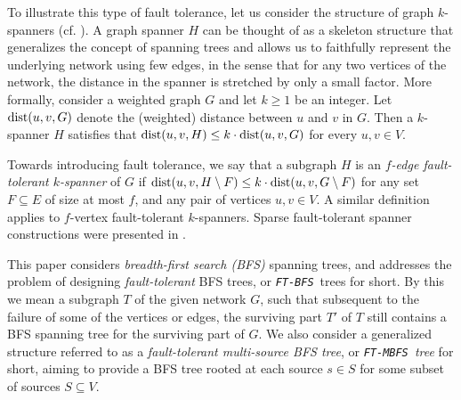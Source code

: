 \documentclass[12pt]{article}
\newcommand{\dist}{\mbox{\rm dist}}
\def\FTMBFS{\mbox{\tt FT-MBFS}}
\def\FTBFS{\mbox{\tt FT-BFS}}
\begin{document}
To illustrate this type of fault tolerance,
let us consider the structure of graph $k$-spanners
(cf. \cite{Peleg00:book,PelegS-89,PelegU-89}).
A graph spanner $H$ can be thought of as a skeleton structure
that generalizes the concept of spanning trees and allows us
to faithfully represent the underlying network using few edges,
in the sense that for any two vertices of the network, the distance
in the spanner is stretched by only a small factor.
More formally, consider a weighted graph $G$ and let $k \geq 1$ be an integer.
Let $\dist(u,v,G)$ denote the (weighted) distance between $u$ and $v$ in $G$.
Then a $k$-spanner $H$ satisfies that
$\dist(u,v,H) \leq  k\cdot \dist(u,v,G)$ for every $u,v\in V$.
\par Towards introducing fault tolerance, we say that a subgraph $H$ is
an {\em $f$-edge fault-tolerant $k$-spanner} of $G$ if
$\dist(u,v,H\setminus F) \leq  k\cdot \dist(u,v,G\setminus F)$
for any set $F\subseteq E$ of size at most $f$,
and any pair of vertices $u,v \in V$. A similar definition applies to
$f$-vertex fault-tolerant $k$-spanners. Sparse fault-tolerant spanner
constructions were presented in \cite{CLPR09-span,DK11}.

This paper considers {\em breadth-first search (BFS)} spanning trees,
and addresses the problem of designing {\em fault-tolerant} BFS trees,
or {\em \FTBFS}\ trees for short.
By this we mean a subgraph $T$ of the given network $G$,
such that subsequent to the failure of some
of the vertices or edges,
the surviving part $T'$ of $T$ still contains a BFS spanning tree for
the surviving part of $G$.
We also consider a generalized structure referred to as a
{\em fault-tolerant multi-source BFS tree}, or {\em \FTMBFS\ tree} for short,
aiming to provide a BFS tree rooted at each source $s\in S$ for some subset
of sources $S\subseteq V$.
\end{document}
